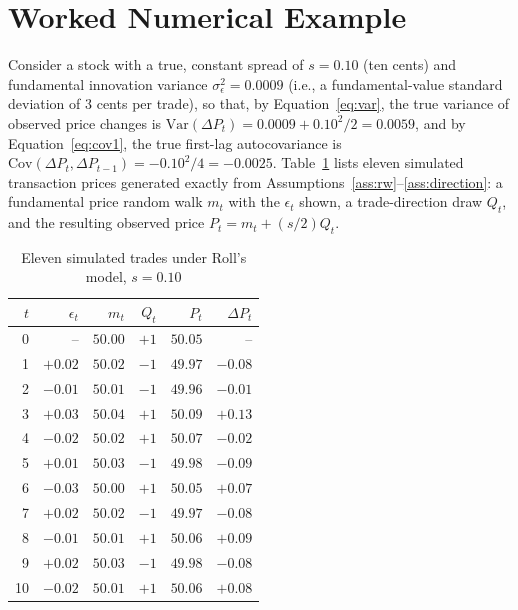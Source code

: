 \documentclass[11pt]{article}
\theoremstyle{remark}
\theoremstyle{definition}
\begin{document}
\section{Worked Numerical Example}
\label{sec:example}

Consider a stock with a true, constant spread of $s=0.10$ (ten cents) and fundamental innovation variance $\sigma_\epsilon^2 = 0.0009$ (i.e., a fundamental-value standard deviation of $3$ cents per trade), so that, by Equation~\eqref{eq:var}, the true variance of observed price changes is $\mathrm{Var}(\Delta P_t) = 0.0009 + 0.10^2/2 = 0.0059$, and by Equation~\eqref{eq:cov1}, the true first-lag autocovariance is $\mathrm{Cov}(\Delta P_t,\Delta P_{t-1}) = -0.10^2/4 = -0.0025$. Table~\ref{tab:sim} lists eleven simulated transaction prices generated exactly from Assumptions~\ref{ass:rw}--\ref{ass:direction}: a fundamental price random walk $m_t$ with the $\epsilon_t$ shown, a trade-direction draw $Q_t$, and the resulting observed price $P_t = m_t + (s/2)Q_t$.

\begin{table}[htbp]
\centering
\caption{Eleven simulated trades under Roll's model, $s=0.10$}
\label{tab:sim}
\begin{tabular}{@{}rrrrrr@{}}
\toprule
$t$ & $\epsilon_t$ & $m_t$ & $Q_t$ & $P_t$ & $\Delta P_t$ \\
\midrule
0 & --      & $50.00$ & $+1$ & $50.05$ & --       \\
1 & $+0.02$ & $50.02$ & $-1$ & $49.97$ & $-0.08$  \\
2 & $-0.01$ & $50.01$ & $-1$ & $49.96$ & $-0.01$  \\
3 & $+0.03$ & $50.04$ & $+1$ & $50.09$ & $+0.13$  \\
4 & $-0.02$ & $50.02$ & $+1$ & $50.07$ & $-0.02$  \\
5 & $+0.01$ & $50.03$ & $-1$ & $49.98$ & $-0.09$  \\
6 & $-0.03$ & $50.00$ & $+1$ & $50.05$ & $+0.07$  \\
7 & $+0.02$ & $50.02$ & $-1$ & $49.97$ & $-0.08$  \\
8 & $-0.01$ & $50.01$ & $+1$ & $50.06$ & $+0.09$  \\
9 & $+0.02$ & $50.03$ & $-1$ & $49.98$ & $-0.08$  \\
10 & $-0.02$ & $50.01$ & $+1$ & $50.06$ & $+0.08$ \\
\bottomrule
\end{tabular}
\end{table}
\end{document}
